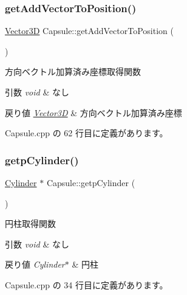 \subsubsection{\texorpdfstring{get\+Add\+Vector\+To\+Position()}{getAddVectorToPosition()}}
{\footnotesize\ttfamily \mbox{\hyperlink{class_vector3_d}{Vector3D}} Capsule\+::get\+Add\+Vector\+To\+Position (\begin{DoxyParamCaption}{ }\end{DoxyParamCaption})}



方向ベクトル加算済み座標取得関数 


\begin{DoxyParams}{引数}
{\em void} & なし \\
\hline
\end{DoxyParams}

\begin{DoxyRetVals}{戻り値}
{\em \mbox{\hyperlink{class_vector3_d}{Vector3D}}} & 方向ベクトル加算済み座標 \\
\hline
\end{DoxyRetVals}


 Capsule.\+cpp の 62 行目に定義があります。

\mbox{\label{class_capsule_a86fceb506f99d999cec56a5c316a5c7a}} 
\subsubsection{\texorpdfstring{getp\+Cylinder()}{getpCylinder()}}
{\footnotesize\ttfamily \mbox{\hyperlink{class_cylinder}{Cylinder}} $\ast$ Capsule\+::getp\+Cylinder (\begin{DoxyParamCaption}{ }\end{DoxyParamCaption})}



円柱取得関数 


\begin{DoxyParams}{引数}
{\em void} & なし \\
\hline
\end{DoxyParams}

\begin{DoxyRetVals}{戻り値}
{\em Cylinder$\ast$} & 円柱 \\
\hline
\end{DoxyRetVals}


 Capsule.\+cpp の 34 行目に定義があります。

